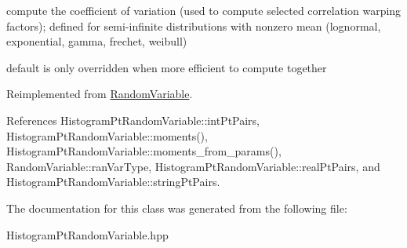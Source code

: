 compute the coefficient of variation (used to compute selected correlation warping factors); defined for semi-\/infinite distributions with nonzero mean (lognormal, exponential, gamma, frechet, weibull) 

default is only overridden when more efficient to compute together 

Reimplemented from \hyperlink{classPecos_1_1RandomVariable_ae1cf1c07047d7ad9dbb899aa01138d54}{Random\+Variable}.



References Histogram\+Pt\+Random\+Variable\+::int\+Pt\+Pairs, Histogram\+Pt\+Random\+Variable\+::moments(), Histogram\+Pt\+Random\+Variable\+::moments\+\_\+from\+\_\+params(), Random\+Variable\+::ran\+Var\+Type, Histogram\+Pt\+Random\+Variable\+::real\+Pt\+Pairs, and Histogram\+Pt\+Random\+Variable\+::string\+Pt\+Pairs.



The documentation for this class was generated from the following file\+:\begin{DoxyCompactItemize}
\item 
Histogram\+Pt\+Random\+Variable.\+hpp\end{DoxyCompactItemize}
